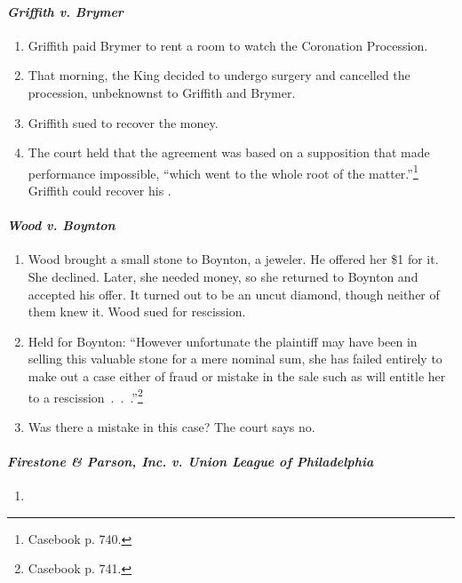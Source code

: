 {\paragraph{\emph{Griffith v. Brymer}}

\begin{enumerate}
    \item Griffith paid Brymer  to rent a room to watch the 
    Coronation Procession.
    \item That morning, the King decided to undergo surgery and cancelled the 
    procession, unbeknownst to Griffith and Brymer.
    \item Griffith sued to recover the money.
    \item The court held that the agreement was based on a supposition that 
    made performance impossible, ``which went to the whole root of the 
    matter.''\footnote{Casebook p. 740.} Griffith could recover his 
    .
\end{enumerate}

\paragraph{\emph{Wood v. Boynton}}

\begin{enumerate}
    \item Wood brought a small stone to Boynton, a jeweler. He offered her \$1 
    for it. She declined. Later, she needed money, so she returned to Boynton 
    and accepted his offer. It turned out to be an uncut diamond, though 
    neither of them knew it. Wood sued for rescission.
    \item Held for Boynton: ``However unfortunate the plaintiff may have been 
    in selling this valuable stone for a mere nominal sum, she has failed 
    entirely to make out a case either of fraud or mistake in the sale such as 
    will entitle her to a rescission~.~.~.''\footnote{Casebook p. 741.}
    \item Was there a mistake in this case? The court says no.
\end{enumerate}

\paragraph{\emph{Firestone \& Parson, Inc. v. Union League of Philadelphia}}

\begin{enumerate}
    \item %
\end{enumerate}

}
